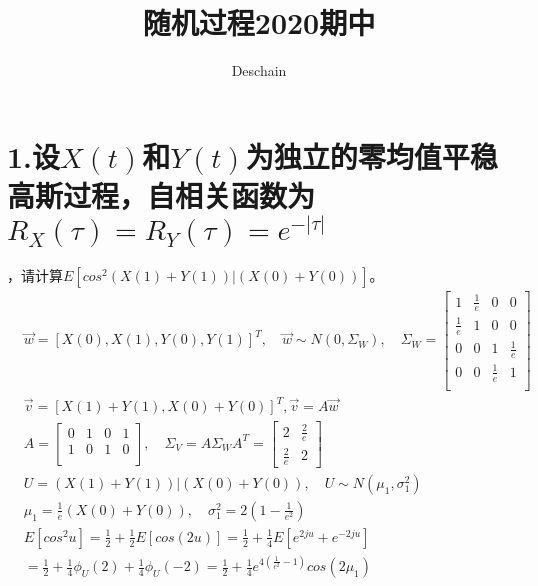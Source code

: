 \documentclass[UTF8]{ctexart}
\title{随机过程2020期中}
\author{Deschain}
\begin{document}
\maketitle
\section*{1.设$X(t)$和$Y(t)$为独立的零均值平稳高斯过程，自相关函数为$R_X(\tau)=R_Y(\tau)=
    e^{-\lvert\tau\rvert}$}，请计算$E[cos^2(X(1)+Y(1))\lvert(X(0)+Y(0))]$。\\
\begin{equation*}
  \begin{aligned}
     & \vec w=[X(0),X(1),Y(0),Y(1)]^T,\quad\vec w\sim N(0,\Sigma_W),\quad\Sigma_W=
    \begin{bmatrix}
      1           & \frac{1}{e} & 0           & 0           \\
      \frac{1}{e} & 1           & 0           & 0           \\
      0           & 0           & 1           & \frac{1}{e} \\
      0           & 0           & \frac{1}{e} & 1           \\
    \end{bmatrix}                                                                 \\
     & \vec v=[X(1)+Y(1),X(0)+Y(0)]^T,\vec v=A\vec w                                          \\
     & A=\begin{bmatrix}
      0 & 1 & 0 & 1 \\
      1 & 0 & 1 & 0 \\
    \end{bmatrix},\quad\Sigma_V=A\Sigma_WA^T=
    \begin{bmatrix}
      2           & \frac{2}{e} \\
      \frac{2}{e} & 2
    \end{bmatrix}                                                                 \\
     & U=(X(1)+Y(1))\lvert(X(0)+Y(0)),\quad U\sim N(\mu_1,\sigma_1^2)                         \\
     & \mu_1=\frac{1}{e}(X(0)+Y(0)),\quad\sigma_1^2=2(1-\frac{1}{e^2})                        \\
     & E[cos^2u]=\frac{1}{2}+\frac{1}{2}E[cos(2u)]=\frac{1}{2}+\frac{1}{4}E[e^{2ju}+e^{-2ju}] \\
     & =\frac{1}{2}+\frac{1}{4}\phi_U(2)+\frac{1}{4}\phi_U(-2)
    =\frac{1}{2}+\frac{1}{4}e^{4(\frac{1}{e^2}-1)}cos(2\mu_1)                                 \\
  \end{aligned}
\end{equation*}
\end{document}
